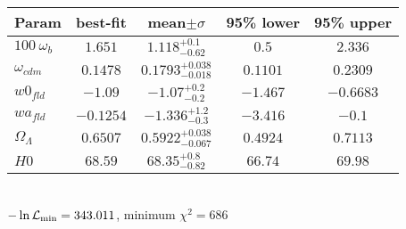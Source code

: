 \begin{tabular}{|l|c|c|c|c|} 
 \hline 
Param & best-fit & mean$\pm\sigma$ & 95\% lower & 95\% upper \\ \hline 
$100~\omega_{b }$ &$1.651$ & $1.118_{-0.62}^{+0.1}$ & $0.5$ & $2.336$ \\ 
$\omega_{cdm }$ &$0.1478$ & $0.1793_{-0.018}^{+0.038}$ & $0.1101$ & $0.2309$ \\ 
$w0_{fld }$ &$-1.09$ & $-1.07_{-0.2}^{+0.2}$ & $-1.467$ & $-0.6683$ \\ 
$wa_{fld }$ &$-0.1254$ & $-1.336_{-0.3}^{+1.2}$ & $-3.416$ & $-0.1$ \\ 
$\Omega_{\Lambda }$ &$0.6507$ & $0.5922_{-0.067}^{+0.038}$ & $0.4924$ & $0.7113$ \\ 
$H0$ &$68.59$ & $68.35_{-0.82}^{+0.8}$ & $66.74$ & $69.98$ \\ 
\hline 
 \end{tabular} \\ 
$-\ln{\cal L}_\mathrm{min} =343.011$, minimum $\chi^2=686$ \\ 
